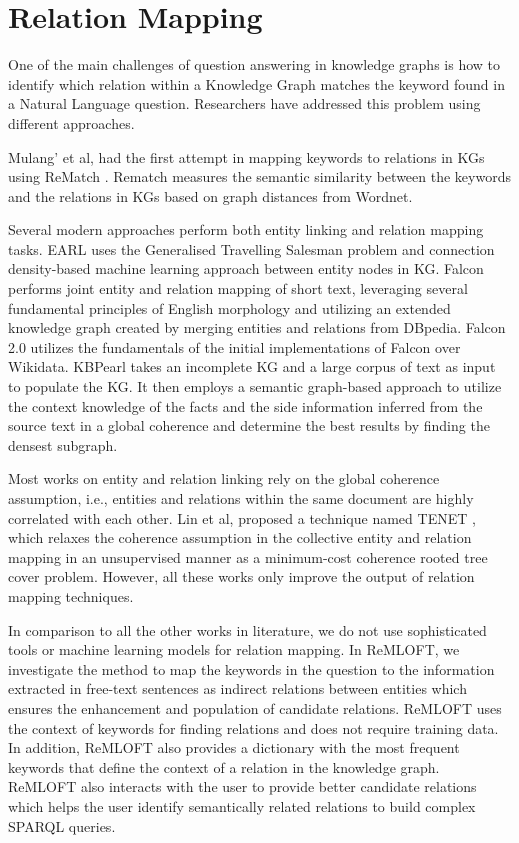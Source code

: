 \section{Relation Mapping}
One of the main challenges of question answering in knowledge graphs is how to identify which relation within a Knowledge Graph matches the keyword found in a Natural Language question. Researchers have addressed this problem using different approaches.

Mulang’ et al, had the first attempt in mapping keywords to relations in KGs using ReMatch \cite{rematch}. Rematch measures the semantic similarity between the keywords and the relations in KGs based on graph distances from Wordnet\cite{wordnet}. 

Several modern approaches perform both entity linking and relation mapping tasks. EARL \cite{earl} uses the Generalised Travelling Salesman problem and connection density-based machine learning approach between entity nodes in KG. Falcon \cite{falcon} performs joint entity and relation mapping of short text, leveraging several fundamental principles of English morphology and utilizing an extended knowledge graph created by merging entities and relations from DBpedia. Falcon 2.0 \cite{falcon2} utilizes the fundamentals of the initial implementations of Falcon over Wikidata. KBPearl \cite{kbpearl} takes an incomplete KG and a large corpus of text as input to populate the KG. It then employs a semantic graph-based approach to utilize the context knowledge of the facts and the side information inferred from the source text in a global coherence and determine the best results by finding the densest subgraph.

Most works on entity and relation linking rely on the global coherence assumption, i.e., entities and relations within the same document are highly correlated with each other. Lin et al, proposed a technique named TENET \cite{tenet}, which relaxes the coherence assumption in the collective entity and relation mapping in an unsupervised manner as a minimum-cost coherence rooted tree cover problem. However, all these works only improve the output of relation mapping techniques. 

In comparison to all the other works in literature, we do not use sophisticated tools or machine learning models for relation mapping. In ReMLOFT, we investigate the method to map the keywords in the question to the information extracted in free-text sentences as indirect relations between entities which ensures the enhancement and population of candidate relations. ReMLOFT uses the context of keywords for finding relations and does not require training data. In addition, ReMLOFT also provides a dictionary with the most frequent keywords that define the context of a relation in the knowledge graph. ReMLOFT also interacts with the user to provide better candidate relations which helps the user identify semantically related relations to build complex SPARQL queries.


